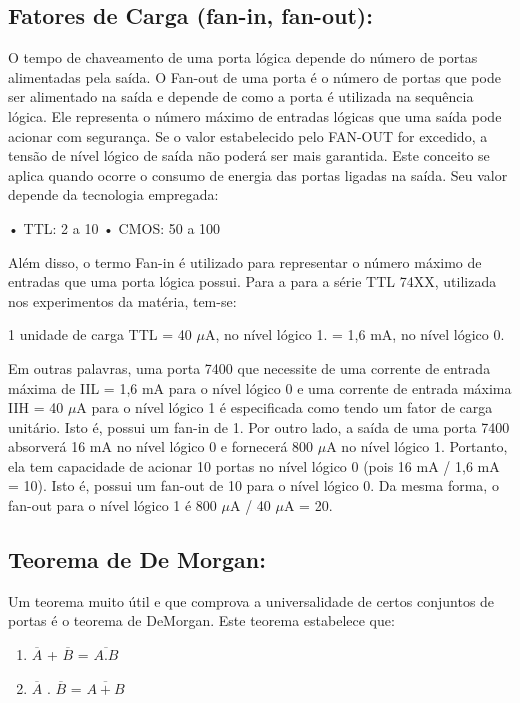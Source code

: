 \documentclass[12pt]{article}
\begin{document}
\subsection{ Fatores de Carga (fan-in, fan-out):}

O tempo de chaveamento de uma porta lógica depende do número de portas alimentadas pela saída. O Fan-out de uma porta é o número de portas que pode ser alimentado na saída e depende de como a porta é utilizada na sequência lógica. Ele representa o número máximo de entradas lógicas que uma saída pode acionar com segurança. Se o valor estabelecido pelo FAN-OUT for excedido, a tensão de nível lógico de saída não poderá ser mais garantida. Este conceito se aplica quando ocorre o consumo de energia das portas ligadas na saída. Seu valor depende da tecnologia empregada: 

• TTL: 2 a 10 
• CMOS: 50 a 100

Além disso, o termo Fan-in é utilizado para representar o número máximo de entradas que uma porta lógica possui. Para a para a série TTL 74XX, utilizada nos experimentos da matéria, tem-se: 

1 unidade de carga TTL = 40 $\mu$A, no nível lógico 1. 
= 1,6 mA, no nível lógico 0. 

Em outras palavras, uma porta 7400 que necessite de uma corrente de entrada máxima de IIL = 1,6 mA para o nível lógico 0 e uma corrente de entrada máxima IIH = 40 $\mu$A para o nível lógico 1 é especificada como tendo um fator de carga unitário. Isto é, possui um fan-in de 1. Por outro lado, a saída de uma porta 7400 absorverá 16 mA no nível lógico 0 e fornecerá 800 $\mu$A no nível lógico 1. Portanto, ela tem capacidade de acionar 10 portas no nível lógico 0 (pois 16 mA / 1,6 mA = 10). Isto é, possui um fan-out de 10 para o nível lógico 0. Da mesma forma, o fan-out para o nível lógico 1 é 800 $\mu$A / 40 $\mu$A = 20.


\subsection{Teorema de De Morgan:}

Um teorema muito útil e que comprova a universalidade de certos conjuntos de portas é o teorema de DeMorgan. Este teorema estabelece que:

\begin{enumerate}
	\item $\overline{A}$ + $\overline{B}$ = $\overline{A.B}$
	\item $\overline{A}$ . $\overline{B}$ = $\overline{A+B}$
\end{enumerate}
\end{document}
